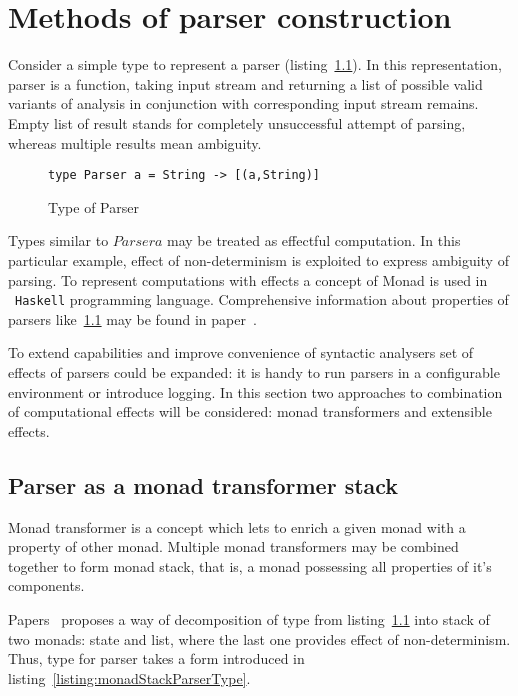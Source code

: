 \chapter{Methods of parser construction}

Consider a simple type to represent a parser (listing~\ref{listing:basicParserType}). 
In this representation, parser is a
function, taking input stream and returning a list of possible valid
variants of analysis in conjunction with corresponding input stream 
remains. Empty list of result stands for completely unsuccessful attempt of 
parsing, whereas multiple results mean ambiguity.

\begin{figure}[h]
\begin{lstlisting}
type Parser a = String -> [(a,String)]
\end{lstlisting}
\caption{Type of Parser}
\label{listing:basicParserType}
\end{figure}

Types similar to $Parser a$ may be treated as effectful computation. In this 
particular example, effect of non-determinism is exploited to express ambiguity 
of parsing. To represent computations with effects a concept of Monad is used in 
~\lstinline{Haskell} programming language. Comprehensive information about 
properties of parsers like~\ref{listing:basicParserType} may be found in 
paper~\cite{monParsing}.

To extend capabilities and improve convenience of syntactic analysers set of 
effects of parsers could be expanded: it is handy to run parsers in a configurable 
environment or introduce logging. In this section two approaches to combination 
of computational effects will be considered: monad transformers and extensible 
effects.

\section{Parser as a monad transformer stack}

  Monad transformer is a concept which lets to enrich a given monad with a 
  property of other monad. Multiple monad transformers may be combined 
  together to form monad stack, that is, a monad possessing all properties of 
  it's components.

  Papers~\cite{monParsing} proposes a way of decomposition of type from 
  listing~\ref{listing:basicParserType} into stack of two monads: state and list,
  where the last one provides effect of non-determinism. Thus, type for parser 
  takes a form introduced in listing~\ref{listing:monadStackParserType}.

